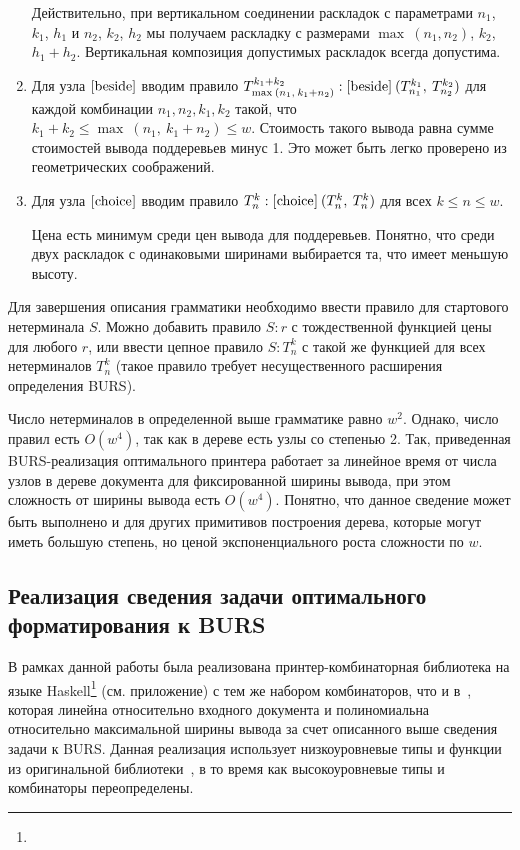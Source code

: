 \begin{enumerate}
Действительно, при вертикальном соединении раскладок с параметрами
$n_1$, $k_1$, $h_1$ и $n_2$, $k_2$, $h_2$ мы получаем раскладку с размерами
$\max\:(n_1,n_2)$, $k_2$, $h_1+h_2$. Вертикальная композиция допустимых раскладок всегда допустима.

\item Для узла $[\mbox{\lstinline{beside}}]$ вводим правило
  $T^{k_1+k_2}_{\max\:(n_1,\:k_1+n_2)}:[\mbox{\lstinline{beside}}]\:(T^{k_1}_{n_1},\:T^{k_2}_{n_2})$
  для каждой комбинации $n_1, n_2, k_1, k_2$ такой, что $k_1+k_2\le\max\:(n_1,\:k_1+n_2)\le w$.
  Стоимость такого вывода равна сумме стоимостей вывода поддеревьев минус 1.
  Это может быть легко проверено из геометрических соображений.

\item Для узла $[\mbox{\lstinline{choice}}]$ вводим правило
  $T^k_n:[\mbox{\lstinline{choice}}]\:(T^k_n,\:T^k_n)$ для всех $k\le n\le w$.

  Цена есть минимум среди цен вывода для поддеревьев. Понятно, что среди двух раскладок
  с одинаковыми ширинами выбирается та, что имеет меньшую высоту.
\end{enumerate}

Для завершения описания грамматики необходимо ввести правило для стартового нетерминала $S$.
Можно добавить правило $S : r$ с тождественной функцией цены для любого $r$, или ввести
цепное правило $S: T_n^k$ с такой же функцией для всех нетерминалов $T_n^k$
(такое правило требует несущественного расширения определения BURS).

Число нетерминалов в определенной выше грамматике равно $w^2$.
Однако, число правил есть $O(w^4)$, так
как в дереве есть узлы со степенью 2. Так, приведенная BURS-реализация оптимального принтера
работает за линейное время от числа узлов в дереве документа для фиксированной ширины вывода, при
этом сложность от ширины вывода есть $O(w^4)$. Понятно, что данное сведение может быть выполнено и
для других примитивов построения дерева, которые могут иметь большую степень, но ценой
экспоненциального роста сложности по $w$.
\label{txt:bursReduction}

\subsection{Реализация сведения задачи оптимального форматирования к BURS}

В рамках данной работы была реализована
принтер-комбинаторная библиотека на языке
Haskell\footnote{}
(см. приложение)
с тем же набором комбинаторов,
что и в~\cite{swierstra},
которая линейна относительно входного документа и полиномиальна
относительно максимальной ширины вывода за счет описанного выше сведения задачи к BURS.
Данная реализация использует низкоуровневые типы и функции из оригинальной
библиотеки~\cite{swierstra}, в то время как высокоуровневые типы и комбинаторы переопределены.

